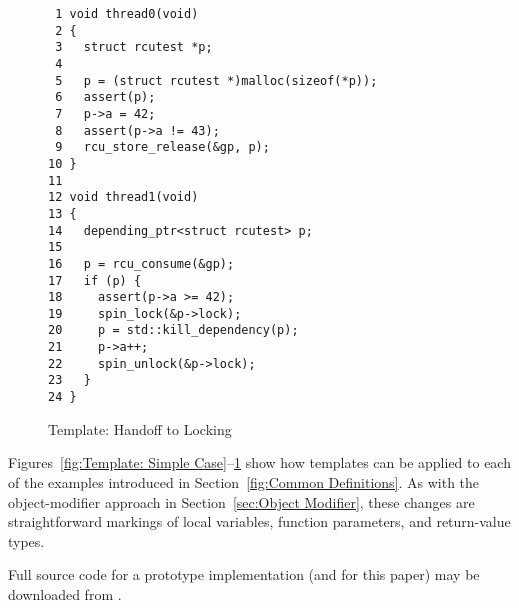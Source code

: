 \begin{figure}[tbp]
{ \scriptsize
\begin{verbatim}
 1 void thread0(void)
 2 {
 3   struct rcutest *p;
 4
 5   p = (struct rcutest *)malloc(sizeof(*p));
 6   assert(p);
 7   p->a = 42;
 8   assert(p->a != 43);
 9   rcu_store_release(&gp, p);
10 }
11
12 void thread1(void)
13 {
14   depending_ptr<struct rcutest> p;
15
16   p = rcu_consume(&gp);
17   if (p) {
18     assert(p->a >= 42);
19     spin_lock(&p->lock);
20     p = std::kill_dependency(p);
21     p->a++;
22     spin_unlock(&p->lock);
23   }
24 }
\end{verbatim}
}
\caption{Template: Handoff to Locking}
\label{fig:Template: Handoff to Locking}
\end{figure}

Figures~\ref{fig:Template: Simple Case}--\ref{fig:Template: Handoff to Locking}
show how templates can be applied to each of the examples
introduced in Section~\ref{fig:Common Definitions}.
As with the object-modifier approach in
Section~\ref{sec:Object Modifier},
these changes are straightforward markings of local variables, function
parameters, and return-value types.

Full source code for a prototype implementation
(and for this paper) may be downloaded from
{\small {}}.
